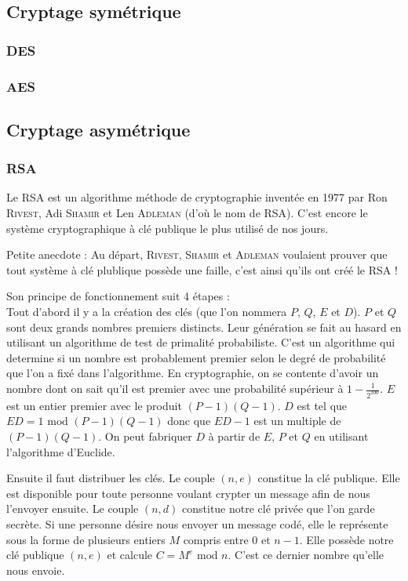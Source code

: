 \documentclass[a4paper,12pt]{article}
\begin{document}
\subsection{Cryptage symétrique}

\subsubsection{DES}

\subsubsection{AES}

\subsection{Cryptage asymétrique}

\subsubsection{RSA}

Le RSA est un algorithme méthode de cryptographie inventée en 1977 par  Ron \textsc{Rivest}, Adi \textsc{Shamir} et Len \textsc{Adleman} (d'où le nom de RSA). C'est encore le système cryptographique à clé publique le plus utilisé de nos jours.

Petite anecdote : Au départ, \textsc{Rivest}, \textsc{Shamir} et \textsc{Adleman} voulaient prouver que tout système à clé plublique possède une faille, c'est ainsi qu'ils ont créé le RSA !

Son principe de fonctionnement suit 4 étapes :\\
Tout d'abord il y a la création des clés (que l'on nommera $P$, $Q$, $E$ et $D$). $P$ et $Q$ sont deux grands nombres premiers distincts. Leur génération se fait au hasard en utilisant un algorithme de test de primalité probabiliste. C'est un algorithme qui determine si un nombre est probablement premier selon le degré de probabilité que l'on a fixé dans l'algorithme. En cryptographie, on se \og contente \fg{} d'avoir un nombre dont on sait qu'il est premier avec une probabilité supérieur à $ 1 - \frac{1}{2^{100}} $. $E$ est un entier premier avec le produit $(P - 1)(Q - 1)$. $D$ est tel que $ED = 1 \textrm{ mod } (P - 1)(Q - 1)$ donc que $ED - 1$ est un multiple de $(P - 1)(Q - 1)$. On peut fabriquer $D$ à partir de $E$, $P$ et $Q$ en utilisant l'algorithme d'Euclide.

Ensuite il faut distribuer les clés. Le couple $(n, e)$ constitue la clé publique. Elle est disponible pour toute personne voulant crypter un message afin de nous l'envoyer ensuite. Le couple $(n, d)$ constitue notre clé privée que l'on garde secrète. Si une personne désire nous envoyer un message codé, elle le représente sous la forme de plusieurs entiers $M$ compris entre 0 et $n - 1$. Elle possède notre clé publique $(n, e)$ et calcule $C = M^{e} \textrm{ mod } n$. C'est ce dernier nombre qu'elle nous envoie.
\end{document}
